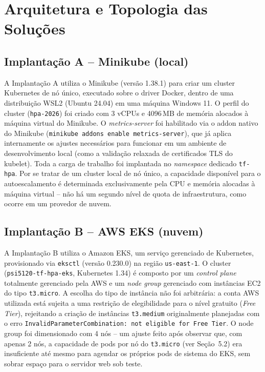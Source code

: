 \documentclass[12pt]{article}
\begin{document}
\section{Arquitetura e Topologia das Soluções}

\subsection{Implantação A -- Minikube (local)}

A Implantação A utiliza o Minikube (versão 1.38.1) para criar um cluster
Kubernetes de nó único, executado sobre o driver Docker, dentro de uma
distribuição WSL2 (Ubuntu 24.04) em uma máquina Windows 11. O perfil do
cluster (\texttt{hpa-2026}) foi criado com 3 vCPUs e 4096\,MB de memória
alocados à máquina virtual do Minikube. O \emph{metrics-server} foi
habilitado via o addon nativo do Minikube
(\texttt{minikube addons enable metrics-server}), que já aplica
internamente os ajustes necessários para funcionar em um ambiente de
desenvolvimento local (como a validação relaxada de certificados TLS do
kubelet). Toda a carga de trabalho foi implantada no \emph{namespace}
dedicado \texttt{tf-hpa}. Por se tratar de um cluster local de nó único, a
capacidade disponível para o autoescalamento é determinada exclusivamente
pela CPU e memória alocadas à máquina virtual -- não há um segundo nível de
quota de infraestrutura, como ocorre em um provedor de nuvem.

\subsection{Implantação B -- AWS EKS (nuvem)}

A Implantação B utiliza o Amazon EKS, um serviço gerenciado de Kubernetes,
provisionado via \texttt{eksctl} (versão 0.230.0) na região
\texttt{us-east-1}. O cluster (\texttt{psi5120-tf-hpa-eks}, Kubernetes
1.34) é composto por um \emph{control plane} totalmente gerenciado pela AWS
e um \emph{node group} gerenciado com instâncias EC2 do tipo
\texttt{t3.micro}. A escolha do tipo de instância não foi arbitrária: a
conta AWS utilizada está sujeita a uma restrição de elegibilidade para o
nível gratuito (\emph{Free Tier}), rejeitando a criação de instâncias
\texttt{t3.medium} originalmente planejadas com o erro
\texttt{InvalidParameterCombination: not eligible for Free Tier}. O node
group foi dimensionado com 4 nós -- um ajuste feito após observar que, com
apenas 2 nós, a capacidade de pods por nó do \texttt{t3.micro} (ver
Seção~5.2) era insuficiente até mesmo para agendar os próprios pods de
sistema do EKS, sem sobrar espaço para o servidor web sob teste.
\end{document}
